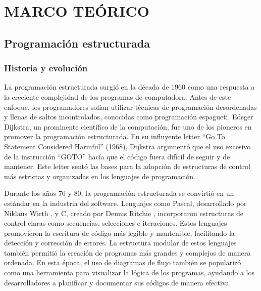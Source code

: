 \chapter{MARCO TEÓRICO}
\section{Programación estructurada}
\subsection{Historia y evolución}
La programación estructurada surgió en la década de 1960 como una respuesta a la creciente complejidad de los programas de computadora. Antes de este enfoque, los programadores solían utilizar técnicas de programación desordenadas y llenas de saltos incontrolados, conocidas como programación espagueti. Edsger Dijkstra, un prominente científico de la computación, fue uno de los pioneros en promover la programación estructurada. En su influyente letter ``Go To Statement Considered Harmful'' (1968), Dijkstra argumentó que el uso excesivo de la instrucción “GOTO” hacía que el código fuera difícil de seguir y de mantener. Este letter sentó las bases para la adopción de estructuras de control más estrictas y organizadas en los lenguajes de programación. \parencite{Dijkstra1968}

Durante los años 70 y 80, la programación estructurada se convirtió en un estándar en la industria del software. Lenguajes como Pascal, desarrollado por Niklaus Wirth \parencite{Barron1981}, y C, creado por Dennis Ritchie \parencite{Kernighan1988}, incorporaron estructuras de control claras como secuencias, selecciones e iteraciones. Estos lenguajes promovieron la escritura de código más legible y mantenible, facilitando la detección y corrección de errores. La estructura modular de estos lenguajes también permitió la creación de programas más grandes y complejos de manera ordenada. En esta época, el uso de diagramas de flujo también se popularizó como una herramienta para visualizar la lógica de los programas, ayudando a los desarrolladores a planificar y documentar sus códigos de manera efectiva.

